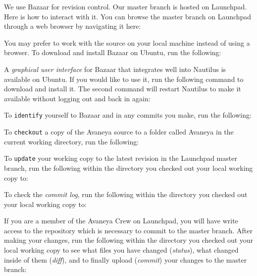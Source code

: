 
We use Bazaar for revision control. Our master branch is hosted on Launchpad. Here is how to interact with it. You can browse the master branch on Launchpad through a web browser by navigating it here:


You may prefer to work with the source on your local machine instead of using a browser. To download and install Bazaar on Ubuntu, run the following:


A {\it graphical user interface} for Bazaar that integrates well into Nautilus is available on Ubuntu. If you would like to use it, run the following command to download and install it. The second command will restart Nautilus to make it available without logging out and back in again:


To {\tt identify} yourself to Bazaar and in any commits you make, run the following:


To {\tt checkout} a copy of the Avaneya source to a folder called Avaneya in the current working directory, run the following:


To {\tt update} your working copy to the latest revision in the Launchpad master branch, run the following within the directory you checked out your local working copy to:


To check the {\it commit log}, run the following within the directory you checked out your local working copy to:


If you are a member of the Avaneya Crew on Launchpad, you will have write access to the repository which is necessary to commit to the master branch. After making your changes, run the following within the directory you checked out your local working copy to see what files you have changed ({\it status}), what changed inside of them ({\it diff}), and to finally upload ({\it commit}) your changes to the master branch:



